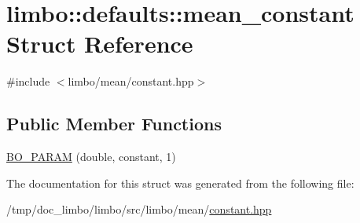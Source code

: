 \hypertarget{structlimbo_1_1defaults_1_1mean__constant}{}\section{limbo\+:\+:defaults\+:\+:mean\+\_\+constant Struct Reference}
\label{structlimbo_1_1defaults_1_1mean__constant}


{\ttfamily \#include $<$limbo/mean/constant.\+hpp$>$}

\subsection*{Public Member Functions}
\begin{DoxyCompactItemize}
\item 
\hyperlink{group__mean__defaults_gafa1b143b975c61c4547a005794f44a12}{B\+O\+\_\+\+P\+A\+R\+AM} (double, constant, 1)
\end{DoxyCompactItemize}


The documentation for this struct was generated from the following file\+:\begin{DoxyCompactItemize}
\item 
/tmp/doc\+\_\+limbo/limbo/src/limbo/mean/\hyperlink{constant_8hpp}{constant.\+hpp}\end{DoxyCompactItemize}
